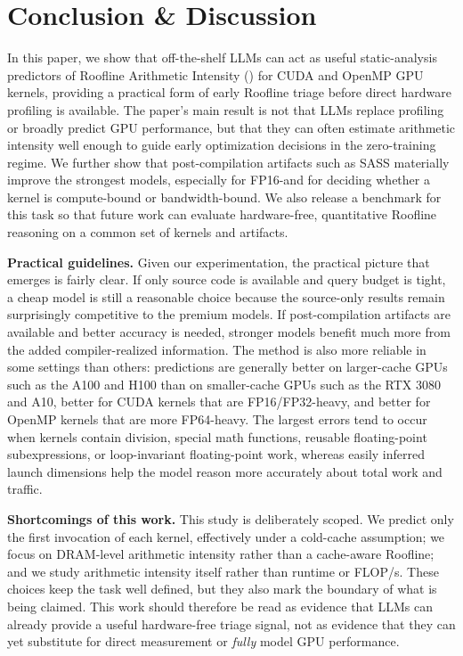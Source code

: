 
\section{Conclusion \& Discussion}
\label{sec:conclusion}
In this paper, we show that off-the-shelf LLMs can act as useful static-analysis predictors of Roofline Arithmetic Intensity (\rai) for CUDA and OpenMP GPU kernels, providing a practical form of early Roofline triage before direct hardware profiling is available.
The paper's main result is not that LLMs replace profiling or broadly predict GPU performance, but that they can often estimate arithmetic intensity well enough to guide early optimization decisions in the zero-training regime.
We further show that post-compilation artifacts such as SASS materially improve the strongest models, especially for FP16-\rai and for deciding whether a kernel is compute-bound or bandwidth-bound. We also release a benchmark for this task so that future work can evaluate hardware-free, quantitative Roofline reasoning on a common set of kernels and artifacts.

\textbf{Practical guidelines.}
Given our experimentation, the practical picture that emerges is fairly clear.
If only source code is available and query budget is tight, a cheap model is still a reasonable choice because the source-only results remain surprisingly competitive to the premium models.
If post-compilation artifacts are available and better accuracy is needed, stronger models benefit much more from the added compiler-realized information.
The method is also more reliable in some settings than others: predictions are generally better on larger-cache GPUs such as the A100 and H100 than on smaller-cache GPUs such as the RTX 3080 and A10, better for CUDA kernels that are FP16/FP32-heavy, and better for OpenMP kernels that are more FP64-heavy.
The largest errors tend to occur when kernels contain division, special math functions, reusable floating-point subexpressions, or loop-invariant floating-point work, whereas easily inferred launch dimensions help the model reason more accurately about total work and traffic.

\textbf{Shortcomings of this work.}
This study is deliberately scoped.
We predict only the first invocation of each kernel, effectively under a cold-cache assumption; we focus on DRAM-level arithmetic intensity rather than a cache-aware Roofline; and we study arithmetic intensity itself rather than runtime or FLOP/s.
These choices keep the task well defined, but they also mark the boundary of what is being claimed.
This work should therefore be read as evidence that LLMs can already provide a useful hardware-free triage signal, not as evidence that they can yet substitute for direct measurement or \textit{fully} model GPU performance.


